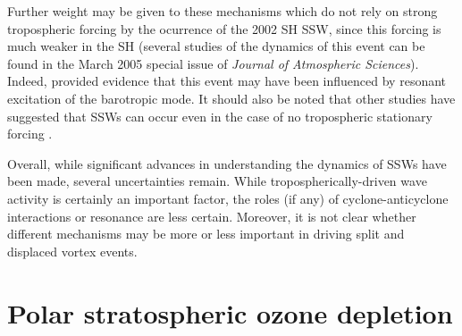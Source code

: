 Further weight may be given to these mechanisms which do not rely on strong
tropospheric forcing by the ocurrence of the 2002 SH SSW, since this forcing is
much weaker in the SH (several studies of the dynamics of this event can be
found in the March 2005 special issue of \emph{Journal of Atmospheric
  Sciences}). Indeed, \citet{Esler2006} provided evidence that this event may
have been influenced by resonant excitation of the barotropic mode. It should
also be noted that other studies have suggested that SSWs can occur even in the
case of no tropospheric stationary forcing \citep{Kushner2005}.

Overall, while significant advances in understanding the dynamics of SSWs have
been made, several uncertainties remain. While tropospherically-driven wave
activity is certainly an important factor, the roles (if any) of
cyclone-anticyclone interactions or resonance are less certain. Moreover, it is
not clear whether different mechanisms may be more or less important in driving
split and displaced vortex events.


\section{Polar stratospheric ozone depletion}

